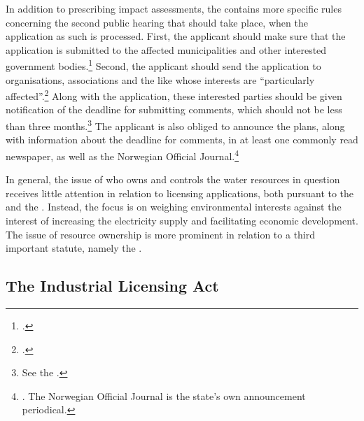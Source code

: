In addition to prescribing impact assessments, the \cite{wra17} contains more specific rules concerning the second public hearing that should take place, when the application as such is processed. First, the applicant should make sure that the application is submitted to the affected municipalities and other interested government bodies.\dni\footcite[6]{wra17} Second, the applicant should send the application to organisations, associations and the like whose interests are ``particularly affected''.\dni\footcite[6]{wra17} Along with the application, these interested parties should be given notification of the deadline for submitting comments, which should not be less than three months.\footnote{See the \dni\cite[6]{wra17}.} The applicant is also obliged to announce the plans, along with information about the deadline for comments, in at least one commonly read newspaper, as well as the Norwegian Official Journal.\footnote{\dni\cite[6]{wra17}. The Norwegian Official Journal is the state's own announcement periodical.}


In general, the issue of who owns and controls the water resources in question receives little attention in relation to licensing applications, both pursuant to the \cite{wra17} and the \cite{wra00}. Instead, the focus is on weighing environmental interests against the interest of increasing the electricity supply and facilitating economic development. The issue of resource ownership is more prominent in relation to a third important statute, namely the \cite{ica17}.

\subsection{The Industrial Licensing Act}\label{sec:ica17}

